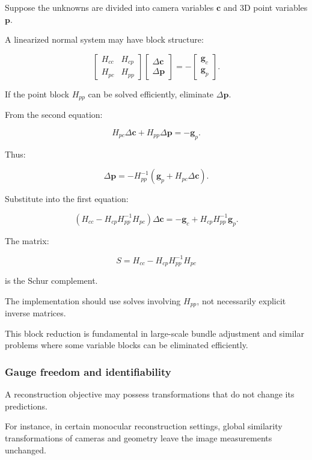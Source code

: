 Suppose the unknowns are divided into camera variables \(\mathbf c\) and 3D point variables \(\mathbf p\).

A linearized normal system may have block structure:

\[
\begin{bmatrix} H_{cc}&H_{cp}\\ H_{pc}&H_{pp} \end{bmatrix} \begin{bmatrix} \Delta\mathbf c\\ \Delta\mathbf p \end{bmatrix} = - \begin{bmatrix} \mathbf g_c\\ \mathbf g_p \end{bmatrix}.
\]

If the point block \(H_{pp}\) can be solved efficiently, eliminate \(\Delta\mathbf p\).

From the second equation:

\[
H_{pc}\Delta\mathbf c+ H_{pp}\Delta\mathbf p=-\mathbf g_p.
\]

Thus:

\[
\Delta\mathbf p= -H_{pp}^{-1} (\mathbf g_p+H_{pc}\Delta\mathbf c).
\]

Substitute into the first equation:

\[
\boxed{ \left( H_{cc}-H_{cp}H_{pp}^{-1}H_{pc} \right) \Delta\mathbf c = -\mathbf g_c+ H_{cp}H_{pp}^{-1}\mathbf g_p }.
\]

The matrix:

\[
\boxed{ S=H_{cc}-H_{cp}H_{pp}^{-1}H_{pc} }
\]

is the Schur complement.

The implementation should use solves involving \(H_{pp}\), not necessarily explicit inverse matrices.

This block reduction is fundamental in large-scale bundle adjustment and similar problems where some variable blocks can be eliminated efficiently.

\subsubsection{Gauge freedom and identifiability}\label{02-foundations-ii-ch028-gauge-freedom-and-identifiability}

A reconstruction objective may possess transformations that do not change its predictions.

For instance, in certain monocular reconstruction settings, global similarity transformations of cameras and geometry leave the image measurements unchanged.


